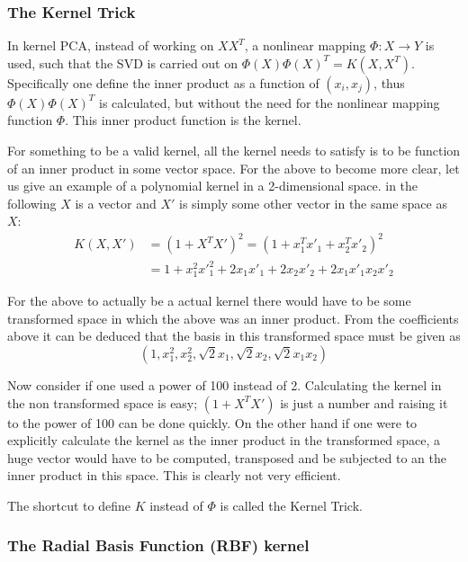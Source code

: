\subsubsection{The Kernel Trick}

In kernel PCA, instead of working on $X X^T$, a nonlinear mapping $\Phi: X\rightarrow Y$ is used, such that the SVD is carried out on $\Phi(X)\Phi(X)^T = K(X, X^T)$. Specifically one define the inner product as a function of $(x_i, x_j)$, thus $\Phi(X)\Phi(X)^T$ is calculated, but without the need for the nonlinear mapping function $\Phi$. This inner product function is the kernel.
 
For something to be a valid kernel, all the kernel needs to satisfy is to be function of an inner product in some vector space.
For the above to become more clear, let us give an example of a polynomial kernel in a 2-dimensional space. in the following $X$ is a vector and $X'$ is simply some other vector in the same space as $X$:
\begin{equation}
\begin{split}
K(X,X') &= (1+X^T X')^2 = (1+x_1^T x'_1+x_2^T x'_2)^2 \\
&= 1+x_1^2 {x'}_1^2 +2 x_1 x'_1 + 2 x_2 x'_2 + 2 x_1 x'_1 x_2 x'_2
\end{split}
\end{equation}

For the above to actually be a actual kernel there would have to be some transformed space in which the above was an inner product. From the coefficients above it can be deduced that the basis in this transformed space must be given as
\begin{equation}
(1,x_1^2,x_2^2,\sqrt{2} x_1, \sqrt{2} x_2 , \sqrt{2} x_1 x_2)
\end{equation}

Now consider if one used a power of 100 instead of 2. Calculating the kernel in the non transformed  space is easy; $(1+X^T X')$ is just a number and raising it to the power of 100 can be done quickly.
On the other hand if one were to explicitly calculate the kernel as the inner product in the transformed space, a huge vector would have to be computed, transposed and be subjected to an the inner product in this space. This is clearly not very efficient.

The shortcut to define $K$ instead of $\Phi$ is called the Kernel Trick.

\subsubsection{The Radial Basis Function (RBF) kernel}

